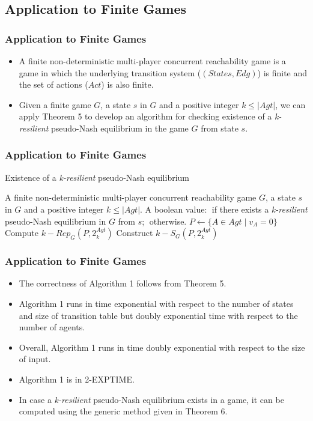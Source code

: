 \documentclass{beamer}
\begin{document}
\subsection*{Application to Finite Games}
\begin{frame}
\frametitle{Application to Finite Games}
  \begin{itemize}
	\item A finite non-deterministic multi-player concurrent reachability game is a game in which the underlying transition system ($(States, Edg)$) is finite and the set of actions ($Act$) is also finite.
 	\item Given a finite game $G$, a state $s$ in $G$ and a positive integer $k \leq \vert Agt \vert$, we can apply Theorem 5 to develop an algorithm for checking existence of a \textit{k-resilient} pseudo-Nash equilibrium in the game $G$ from state $s$.
  \end{itemize}
\end{frame}

\begin{frame}
\frametitle{Application to Finite Games}
\begin{algorithm}[H]
\scriptsize
\caption{Existence of a \textit{k-resilient} pseudo-Nash equilibrium}
\begin{algorithmic}[1]
\renewcommand{\algorithmicrequire}{\textbf{Input:}}
\renewcommand{\algorithmicensure}{\textbf{Output:}}
\REQUIRE A finite non-deterministic multi-player concurrent reachability game $G$, a state $s$ in $G$ and a positive integer $k \leq \vert Agt \vert$.
\ENSURE A boolean value: \TRUE $\;$if there exists a \textit{k-resilient} pseudo-Nash equilibrium in $G$ from $s$; \FALSE $\;$otherwise.
\STATE $P \leftarrow \lbrace A \in Agt \; \vert \; v_{A} = 0 \rbrace$
\STATE Compute $k-Rep_{G}(P, 2^{Agt}_{k})$
\STATE Construct $k-S_{G}(P, 2^{Agt}_{k})$
\RETURN \TRUE
\ENDIF
\ENDFOR
\ENDFOR
\RETURN \FALSE
\end{algorithmic}
\end{algorithm}
\end{frame}

\begin{frame}
\frametitle{Application to Finite Games}
  \begin{itemize}
	\item The correctness of Algorithm 1 follows from Theorem 5.
 	\item Algorithm 1 runs in time exponential with respect to the number of states and size of transition table but doubly exponential time with respect to the number of agents.
 	\item Overall, Algorithm 1 runs in time doubly exponential with respect to the size of input.
 	\item Algorithm 1 is in 2-EXPTIME.
 	\item In case a \textit{k-resilient} pseudo-Nash equilibrium exists in a game, it can be computed using the generic method given in Theorem 6.
  \end{itemize}
\end{frame}
\end{document}
